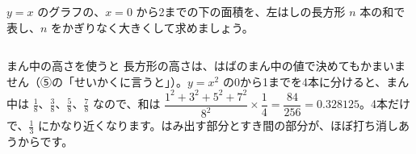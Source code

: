 \begin{jibun}
$y=x$ のグラフの、$x=0$ から2までの下の面積を、左はしの長方形 $n$ 本の和で表し、$n$ をかぎりなく大きくして求めましょう。
\end{jibun}

\begin{column}{まん中の高さを使うと}
長方形の高さは、はばのまん中の値で決めてもかまいません（⑤の「せいかくに言うと」）。$y=x^2$ の0から1までを4本に分けると、まん中は $\frac{1}{8}$、$\frac{3}{8}$、$\frac{5}{8}$、$\frac{7}{8}$ なので、和は $\dfrac{1^2+3^2+5^2+7^2}{8^2}\times\dfrac{1}{4}=\dfrac{84}{256}=0.328125$。4本だけで、$\frac{1}{3}$ にかなり近くなります。はみ出す部分とすき間の部分が、ほぼ打ち消しあうからです。\par\vspace{2pt}


\end{column}
